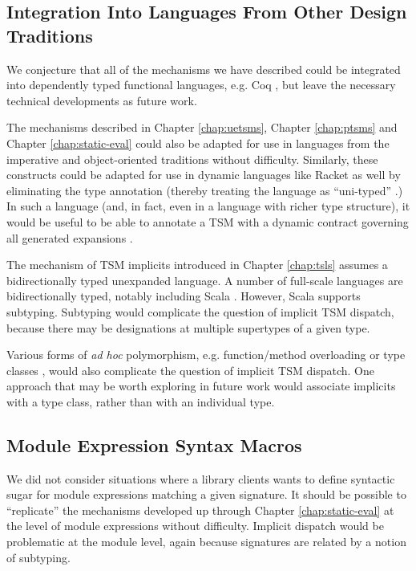\subsection{Integration Into Languages From Other Design Traditions}
\label{sec:integration}
We conjecture that all of the mechanisms we have described could be integrated into dependently typed functional languages, e.g. Coq \cite{Coq:manual}, but leave the necessary technical developments as future work.

The mechanisms described in Chapter \ref{chap:uetsms}, Chapter \ref{chap:ptsms} and Chapter \ref{chap:static-eval} could also be adapted for use in languages from the imperative and object-oriented traditions without difficulty. Similarly, these constructs could be adapted for use in dynamic languages like Racket as well by eliminating the type annotation (thereby treating the language as ``uni-typed'' \cite{scott1980lambda,pfpl}.) In such a language (and, in fact, even in a language with richer type structure), it would be useful to be able to annotate a TSM with a dynamic contract governing all generated expansions \cite{DBLP:conf/icfp/FindlerF02}. 

The mechanism of TSM implicits introduced in Chapter \ref{chap:tsls} assumes a bidirectionally typed unexpanded language. A number of full-scale languages are bidirectionally typed, notably including Scala \cite{odersky2008programming}. However, Scala supports subtyping. Subtyping would complicate the question of implicit TSM dispatch, because there may be designations at multiple supertypes of a given type.

Various forms of \emph{ad hoc} polymorphism, e.g. function/method overloading or type classes \cite{Hall:1996:TCH:227699.227700}, would also complicate the question of implicit TSM dispatch. One approach that may be worth exploring in future work would associate implicits with a type class, rather than with an individual type.

\subsection{Module Expression Syntax Macros}
We did not consider situations where a library clients wants to define syntactic sugar for  module expressions matching a given signature. It should be possible to ``replicate'' the mechanisms developed up through Chapter \ref{chap:static-eval} at the level of module expressions without difficulty. Implicit dispatch would be problematic at the module level, again because signatures are related by a notion of subtyping.

